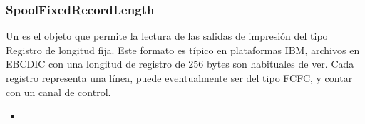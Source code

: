 \documentclass[a4paper,12pt,spanish]{sphinxmanual}
\begin{document}
\subsubsection{SpoolFixedRecordLength}
\label{\detokenize{openerm.SpoolFixedRecordLength:module-openerm.SpoolFixedRecordLength}}\label{\detokenize{openerm.SpoolFixedRecordLength:spoolfixedrecordlength}}\label{\detokenize{openerm.SpoolFixedRecordLength::doc}}
Un  es el objeto que permite la lectura de las salidas
de impresión del tipo Registro de longitud fija. Este formato es típico en
plataformas IBM, archivos en EBCDIC con una longitud de registro de 256 bytes
son habituales de ver. Cada registro representa una línea, puede eventualmente
ser del tipo FCFC, y contar con un canal de control.



\begin{itemize}
\item {} 
{\hyperref[\detokenize{openerm.SpoolHostReprint:module-openerm.SpoolHostReprint}]{}}

\end{itemize}


\end{document}
